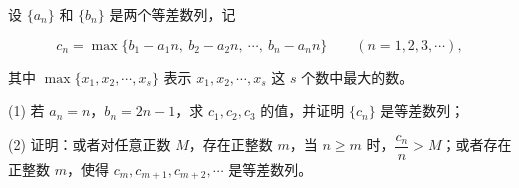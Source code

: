 \begin{question}
设 $\{a_n\}$ 和 $\{b_n\}$ 是两个等差数列，记

\nopagebreak[4]
\[
c_n=\max\{b_1-a_1n,\ b_2-a_2n,\ \cdots,\ b_n-a_nn\}\qquad(n=1,2,3,\cdots),
\]

其中 $\max\{x_1,x_2,\cdots,x_s\}$ 表示 $x_1,x_2,\cdots,x_s$ 这 $s$ 个数中最大的数。

(1) 若 $a_n=n$，$b_n=2n-1$，求 $c_1,c_2,c_3$ 的值，并证明 $\{c_n\}$ 是等差数列；

(2) 证明：或者对任意正数 $M$，存在正整数 $m$，当 $n\geqslant m$ 时，$\dfrac{c_n}{n}>M$；或者存在正整数 $m$，使得 $c_m,c_{m+1},c_{m+2},\cdots$ 是等差数列。



\end{question}